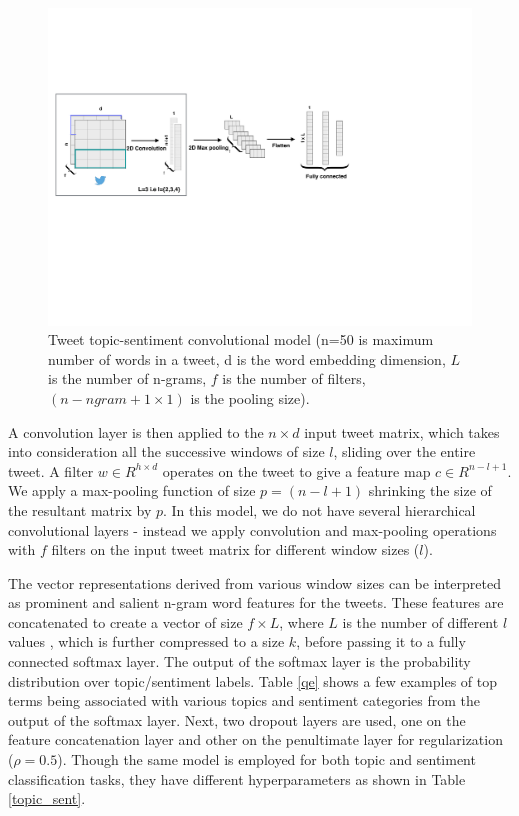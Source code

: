 \documentclass[letterpaper]{article}
\begin{document}
\begin{figure}[]
\centering
\includegraphics[width=\columnwidth]{topic_classifier.pdf}
\caption{Tweet topic-sentiment convolutional model (n=50 is maximum number of words in a tweet, d is the word embedding dimension, $L$ is the number of n-grams, $f$ is the number of filters, $(n-ngram+1\times 1)$ is the pooling size).}
\label{topic_cnn}
\end{figure}

A convolution layer is then applied to the $n \times d$ input tweet matrix, which takes into consideration all the successive windows of size $l$, sliding over the entire tweet. A filter $w \in {R}^{h\times d}$ operates on the tweet to give a feature map $c\in {R}^{n-l+1}$. We apply a max-pooling function \cite{collobert2011natural} of size $p=(n-l+1)$ shrinking the size of the resultant matrix by $p$. In this model, we do not have several hierarchical convolutional layers - instead we apply convolution and max-pooling operations with $f$ filters on the input tweet matrix for different window sizes ($l$). 


The vector representations derived from various window sizes can be interpreted as prominent and salient n-gram word features for the tweets. These features are concatenated to create a vector of size $f \times L$, where $L$ is the number of different $l$ values , which is further compressed to a size $k$, before passing it to a fully connected softmax layer. The output of the softmax layer is the probability distribution over topic/sentiment labels. Table \ref{qe} shows a few examples of top terms being associated with various topics and sentiment categories from the output of the softmax layer. Next, two dropout layers are used, one on the feature concatenation layer and other on the penultimate layer for regularization ($\rho=0.5$). Though the same model is employed for both topic and sentiment classification tasks, they have different hyperparameters as shown in Table \ref{topic_sent}.
\end{document}
